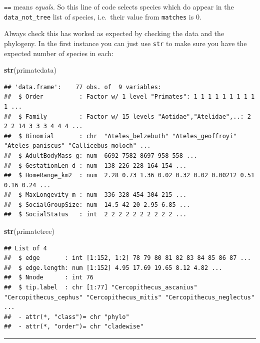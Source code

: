 \documentclass[]{book}
\newenvironment{Shaded}{\begin{snugshade}}{\end{snugshade}}
\newcommand{\KeywordTok}[1]{\textcolor[rgb]{0.13,0.29,0.53}{\textbf{{#1}}}}
\newcommand{\NormalTok}[1]{{#1}}
\begin{document}
\texttt{==} means \emph{equals}. So this line of code selects species
which do appear in the \texttt{data\_not\_tree} list of species,
i.e.~their value from \texttt{matches} is 0.

Always check this has worked as expected by checking the data and the
phylogeny. In the first instance you can just use \texttt{str} to make
sure you have the expected number of species in each:

\begin{Shaded}
\begin{Highlighting}[]
\KeywordTok{str}\NormalTok{(primatedata)}
\end{Highlighting}
\end{Shaded}

\begin{verbatim}
## 'data.frame':    77 obs. of  9 variables:
##  $ Order          : Factor w/ 1 level "Primates": 1 1 1 1 1 1 1 1 1 1 ...
##  $ Family         : Factor w/ 15 levels "Aotidae","Atelidae",..: 2 2 2 14 3 3 3 4 4 4 ...
##  $ Binomial       : chr  "Ateles_belzebuth" "Ateles_geoffroyi" "Ateles_paniscus" "Callicebus_moloch" ...
##  $ AdultBodyMass_g: num  6692 7582 8697 958 558 ...
##  $ GestationLen_d : num  138 226 228 164 154 ...
##  $ HomeRange_km2  : num  2.28 0.73 1.36 0.02 0.32 0.02 0.00212 0.51 0.16 0.24 ...
##  $ MaxLongevity_m : num  336 328 454 304 215 ...
##  $ SocialGroupSize: num  14.5 42 20 2.95 6.85 ...
##  $ SocialStatus   : int  2 2 2 2 2 2 2 2 2 2 ...
\end{verbatim}

\begin{Shaded}
\begin{Highlighting}[]
\KeywordTok{str}\NormalTok{(primatetree)}
\end{Highlighting}
\end{Shaded}

\begin{verbatim}
## List of 4
##  $ edge       : int [1:152, 1:2] 78 79 80 81 82 83 84 85 86 87 ...
##  $ edge.length: num [1:152] 4.95 17.69 19.65 8.12 4.82 ...
##  $ Nnode      : int 76
##  $ tip.label  : chr [1:77] "Cercopithecus_ascanius" "Cercopithecus_cephus" "Cercopithecus_mitis" "Cercopithecus_neglectus" ...
##  - attr(*, "class")= chr "phylo"
##  - attr(*, "order")= chr "cladewise"
\end{verbatim}

\begin{center}\rule{0.5\linewidth}{\linethickness}\end{center}
\end{document}
